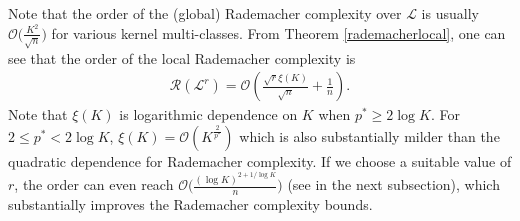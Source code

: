 \documentclass{article}
\begin{document}
Note that the order of the (global) Rademacher complexity over $\mathcal{L}$ is usually
$\mathcal{O}\big(\frac{K^2}{\sqrt{n}}\big)$ for various kernel multi-classes.
From Theorem \ref{rademacherlocal}, one can see that the order of the local Rademacher complexity is
\begin{align*}
  \mathcal{R}(\mathcal{L}^r)=\mathcal{O}\left(\frac{\sqrt{r}\xi(K)}{\sqrt{n}}+\frac{1}{n}\right).
\end{align*}
Note that $\xi(K)$ is logarithmic dependence on $K$ when $p^\ast\geq 2\log K$.
For $2\leq p^\ast < 2\log K$, $\xi(K)=\mathcal{O}(K^{\frac{2}{p^\ast}})$
which is also substantially milder than the quadratic dependence for Rademacher complexity.
If we choose a suitable value of $r$,
the order can even reach $\mathcal{O}\big(\frac{(\log K)^{2+1/\log K}}{n}\big)$ (see in the next subsection),
which substantially improves the Rademacher complexity bounds.
\end{document}
